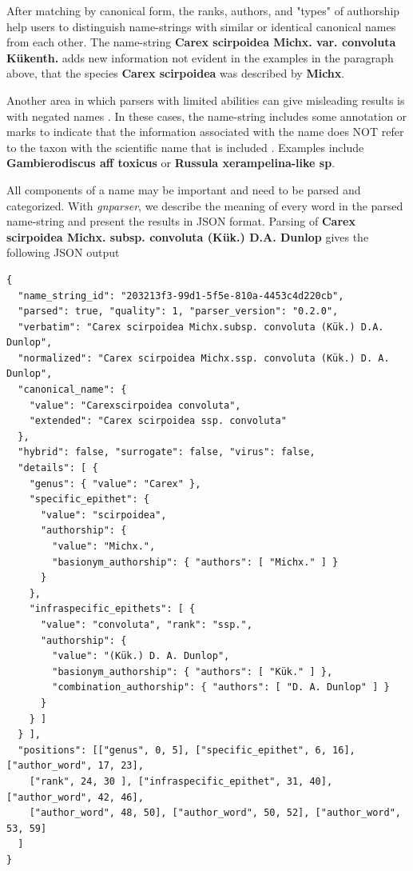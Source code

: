 \documentclass{bmcart}
\begin{document}
After matching by canonical form, the ranks, authors, and "types" of authorship
help users to distinguish name-strings with similar or identical canonical names from each other.
The name-string \textbf{Carex scirpoidea Michx. var. convoluta Kükenth.} adds
new information not evident in the examples in the paragraph above, that the
species \textbf{Carex scirpoidea} was described by \textbf{Michx}.

Another area in which parsers with limited abilities can give misleading results is with
negated names \cite{Patterson:inpress-a}. In these cases, the name-string
includes some annotation or marks to indicate that the information associated with the name does NOT refer to the taxon with the scientific name that is included . Examples include \textbf{Gambierodiscus aff
toxicus} or \textbf{Russula xerampelina-like sp}.

All components of a name may be important and need to be parsed and
categorized. With \textit{gnparser}, we describe the meaning of every word in
the parsed name-string and present the results in JSON format. Parsing of \textbf{Carex
scirpoidea Michx.  subsp. convoluta (Kük.) D.A. Dunlop} gives the following
JSON output
\vspace{0.5cm}

\begin{Verbatim}[fontsize=\small]
{
  "name_string_id": "203213f3-99d1-5f5e-810a-4453c4d220cb",
  "parsed": true, "quality": 1, "parser_version": "0.2.0",
  "verbatim": "Carex scirpoidea Michx.subsp. convoluta (Kük.) D.A. Dunlop",
  "normalized": "Carex scirpoidea Michx.ssp. convoluta (Kük.) D. A. Dunlop",
  "canonical_name": {
    "value": "Carexscirpoidea convoluta",
    "extended": "Carex scirpoidea ssp. convoluta"
  },
  "hybrid": false, "surrogate": false, "virus": false,
  "details": [ {
    "genus": { "value": "Carex" },
    "specific_epithet": {
      "value": "scirpoidea",
      "authorship": { 
        "value": "Michx.", 
        "basionym_authorship": { "authors": [ "Michx." ] }
      }
    },
    "infraspecific_epithets": [ {
      "value": "convoluta", "rank": "ssp.",
      "authorship": {
        "value": "(Kük.) D. A. Dunlop",
        "basionym_authorship": { "authors": [ "Kük." ] },
        "combination_authorship": { "authors": [ "D. A. Dunlop" ] }
      }
    } ]
  } ],
  "positions": [["genus", 0, 5], ["specific_epithet", 6, 16], ["author_word", 17, 23], 
    ["rank", 24, 30 ], ["infraspecific_epithet", 31, 40], ["author_word", 42, 46],
    ["author_word", 48, 50], ["author_word", 50, 52], ["author_word", 53, 59]
  ]
}
\end{Verbatim}
\end{document}
